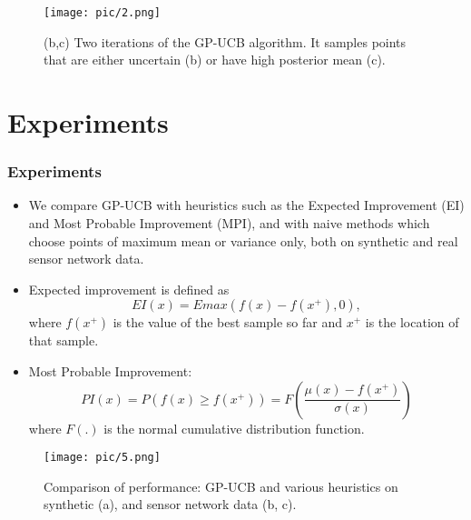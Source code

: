 \documentclass[10pt]{beamer}
\begin{document}
\begin{frame}
    \begin{figure}
        \texttt{[image: pic/2.png]}
        \caption{ (b,c) Two iterations of the GP-UCB algorithm.  It samples points that are either uncertain (b) or have high posterior mean (c).}
    \end{figure}
\end{frame}

\section{Experiments}
\begin{frame}
\frametitle{Experiments}
\begin{itemize}
    \item We  compare GP-UCB with  heuristics  such  as  the Expected   Improvement   (EI)   and   Most   Probable Improvement  (MPI),  and  with  naive  methods  which choose  points  of  maximum  mean  or  variance  only, both on synthetic and real sensor network data.
    \item Expected improvement is defined as
        \begin{equation}
            EI(x)=Emax(f(x)-f(x^+),0),
        \end{equation}
    where ${f(x^+)}$ is the value of the best sample so far and ${x^+}$ is the location of that sample.
    \item Most   Probable Improvement:
        \begin{equation}
            PI(x)=P(f(x)\geq f(x^+))=F\left ( \frac{\mu(x)-f(x^+)}{\sigma(x)} \right )
        \end{equation}
    where ${F(.)}$ is the normal cumulative distribution function. 
\end{itemize}
\end{frame}

\begin{frame}
    \begin{figure}
        \texttt{[image: pic/5.png]}
        \caption{Comparison of performance: GP-UCB and various heuristics on synthetic (a), and sensor network data (b, c).}
    \end{figure}
\end{frame}
\end{document}
